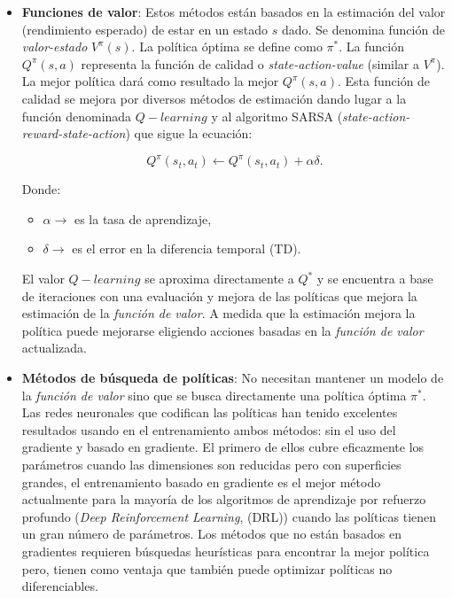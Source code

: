 \begin{itemize}
\item \textbf{Funciones de valor}: Estos métodos están basados en la estimación del valor (rendimiento esperado) de estar en un estado $s$ dado. Se denomina función de \textit{valor-estado} $V^{\pi}(s)$. La política óptima se define como $\pi^*$. La función $Q^{\pi}(s,a)$ representa la función de calidad o \textit{state-action-value} (similar a $V^{\pi}$). La mejor política dará como resultado la mejor $Q^{\pi}(s,a)$. Esta función de calidad se mejora por diversos métodos de estimación dando lugar a la función denominada $Q-learning$\cite{christopher_watkins} y al algoritmo SARSA\cite{miles_brundage} (\textit{state-action-reward-state-action}) que sigue la ecuación:

    $$
    Q^{\pi}(s_t,a_t) \leftarrow Q^{\pi}(s_t,a_t) + \alpha \delta.
    $$
    
    \noindent
    Donde:
    \begin{itemize}
        \item $\alpha \rightarrow$ es la tasa de aprendizaje,
        \item $\delta \rightarrow$ es el error en la diferencia temporal (TD).
    \end{itemize}
    
     El valor $Q-learning$ se aproxima directamente a $Q^*$ y se encuentra a base de iteraciones con una evaluación  y mejora de las políticas que mejora la estimación de la \textit{función de valor}. A medida que la estimación mejora la política puede mejorarse eligiendo acciones basadas en la \textit{función de valor} actualizada.\\

    \item \textbf{Métodos de búsqueda de políticas}: No necesitan mantener un modelo de la \textit{función de valor} sino que se busca directamente una política óptima $\pi^*$. Las redes neuronales que codifican las políticas han tenido excelentes resultados usando en el entrenamiento ambos métodos: sin el uso del gradiente\cite{faustino_gomez} y basado en gradiente\cite{jan_peters}. El primero de ellos cubre eficazmente los parámetros cuando las dimensiones son reducidas pero con superficies grandes, el entrenamiento basado en gradiente es el mejor método actualmente para la mayoría de los algoritmos de aprendizaje por refuerzo profundo (\textit{Deep Reinforcement Learning}, (DRL)) cuando las políticas tienen un gran número de parámetros. Los métodos que no están basados en gradientes requieren búsquedas heurísticas para encontrar la mejor política pero, tienen como ventaja que también puede optimizar políticas no diferenciables.\\
    

\end{itemize}
